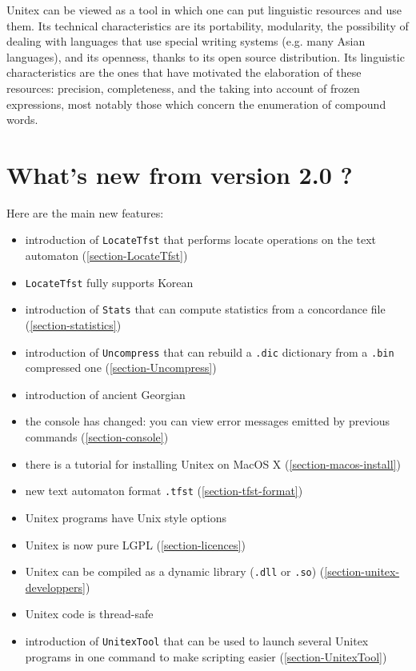 \bigskip
\noindent Unitex can be viewed as a tool in which one can put linguistic resources
and use them. Its technical characteristics are its portability,  modularity,
the possibility of dealing with languages that use special writing systems (e.g. many
Asian languages), and its openness, thanks to its open source distribution. Its
linguistic characteristics are the ones that have motivated the elaboration of
these resources: precision, completeness, and the taking into account of frozen
expressions, most notably those which concern the enumeration of compound words.


\section*{What's new from version 2.0 ?}
Here are the main new features:
\begin{itemize}
  \item introduction of \verb$LocateTfst$ that performs locate operations
        on the text automaton (\ref{section-LocateTfst})
  \item \verb$LocateTfst$ fully supports Korean
  \item introduction of \verb$Stats$ that can compute statistics from a
        concordance file (\ref{section-statistics})
  \item introduction of \verb$Uncompress$ that can rebuild a \verb$.dic$
        dictionary from a \verb$.bin$ compressed one (\ref{section-Uncompress})
  \item introduction of ancient Georgian
  \item the console has changed: you can view error messages emitted by
        previous commands (\ref{section-console})
  \item there is a tutorial for installing Unitex on MacOS X 
       (\ref{section-macos-install})
  \item new text automaton format \verb+.tfst+ (\ref{section-tfst-format})          
  \item Unitex programs have Unix style options
  \item Unitex is now pure LGPL (\ref{section-licences})
  \item Unitex can be compiled as a dynamic library (\verb$.dll$ or \verb$.so$)
  (\ref{section-unitex-developpers})
  \item Unitex code is thread-safe
  \item introduction of \verb$UnitexTool$ that can be used to launch several
  Unitex programs in one command to make scripting easier
  (\ref{section-UnitexTool})
\end{itemize}

